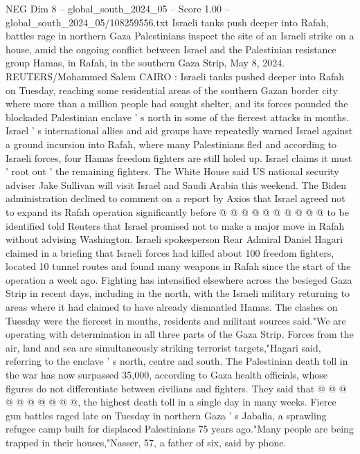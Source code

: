 \begin{textsample}{NEG Dim 8 – global\_south\_2024\_05 – Score 1.00 – global\_south\_2024\_05/108259556.txt}  \label{ex:f8_neg_239}
Israeli tanks push deeper into Rafah, battles rage in northern Gaza Palestinians inspect the site of an Israeli strike on a house, amid the ongoing conflict between Israel and the Palestinian resistance group Hamas, in Rafah, in the southern Gaza Strip, May 8, 2024.
REUTERS/Mohammed Salem CAIRO : Israeli tanks pushed deeper into Rafah on Tuesday, reaching some residential areas of the southern Gazan border city where more than a million people had sought shelter, and its forces pounded the blockaded Palestinian enclave ' s north in some of the fiercest attacks in months.
Israel ' s international allies and aid groups have repeatedly warned Israel against a ground incursion into Rafah, where many Palestinians fled and according to Israeli forces, four Hamas freedom fighters are still holed up.
Israel claims it must ' root out ' the remaining fighters.
The White House said US national security adviser Jake Sullivan will visit Israel and Saudi Arabia this weekend.
The Biden administration declined to comment on a report by Axios that Israel agreed not to expand its Rafah operation significantly before @ @ @ @ @ @ @ @ @ @ to be identified told Reuters that Israel promised not to make a major move in Rafah without advising Washington.
Israeli spokesperson Rear Admiral Daniel Hagari claimed in a briefing that Israeli forces had killed about 100 freedom fighters, located 10 tunnel routes and found many weapons in Rafah since the start of the operation a week ago.
Fighting has intensified elsewhere across the besieged Gaza Strip in recent days, including in the north, with the Israeli military returning to areas where it had claimed to have already dismantled Hamas.
The clashes on Tuesday were the fiercest in months, residents and militant sources said."We are operating with determination in all three parts of the Gaza Strip.
Forces from the air, land and sea are simultaneously striking terrorist targets,"Hagari said, referring to the enclave ' s north, centre and south.
The Palestinian death toll in the war has now surpassed 35,000, according to Gaza health officials, whose figures do not differentiate between civilians and fighters.
They said that @ @ @ @ @ @ @ @ @ @, the highest death toll in a single day in many weeks.
Fierce gun battles raged late on Tuesday in northern Gaza ' s Jabalia, a sprawling refugee camp built for displaced Palestinians 75 years ago."Many people are being trapped in their houses,"Nasser, 57, a father of six, said by phone.

\end{textsample}

